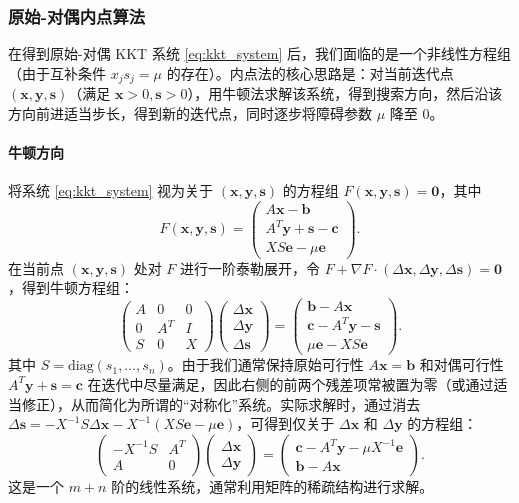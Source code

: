 \documentclass[12pt]{article}
\theoremstyle{plain}
\theoremstyle{definition}
\newcommand{\diag}{\mathrm{diag}}
\begin{document}
\subsubsection{原始-对偶内点算法}\label{subsubsec:primal_dual_algo}

在得到原始-对偶 KKT 系统 \eqref{eq:kkt_system} 后，我们面临的是一个非线性方程组（由于互补条件 $x_j s_j = \mu$ 的存在）。内点法的核心思路是：对当前迭代点 $(\bm{x}, \bm{y}, \bm{s})$（满足 $\bm{x}>0,\bm{s}>0$），用牛顿法求解该系统，得到搜索方向，然后沿该方向前进适当步长，得到新的迭代点，同时逐步将障碍参数 $\mu$ 降至 $0$。

\paragraph{牛顿方向}
将系统 \eqref{eq:kkt_system} 视为关于 $(\bm{x}, \bm{y}, \bm{s})$ 的方程组 $F(\bm{x},\bm{y},\bm{s}) = \bm{0}$，其中
\[
F(\bm{x},\bm{y},\bm{s}) = \begin{pmatrix}
A\bm{x} - \bm{b} \\
A^T\bm{y} + \bm{s} - \bm{c} \\
X S \bm{e} - \mu \bm{e}
\end{pmatrix}.
\]
在当前点 $(\bm{x},\bm{y},\bm{s})$ 处对 $F$ 进行一阶泰勒展开，令 $F + \nabla F \cdot (\Delta \bm{x}, \Delta \bm{y}, \Delta \bm{s}) = \bm{0}$，得到牛顿方程组：
\[
\begin{pmatrix}
A & 0 & 0 \\
0 & A^T & I \\
S & 0 & X
\end{pmatrix}
\begin{pmatrix}
\Delta \bm{x} \\ \Delta \bm{y} \\ \Delta \bm{s}
\end{pmatrix}
=
\begin{pmatrix}
\bm{b} - A\bm{x} \\
\bm{c} - A^T\bm{y} - \bm{s} \\
\mu \bm{e} - X S \bm{e}
\end{pmatrix}.
\]
其中 $S = \diag(s_1,\dots,s_n)$。由于我们通常保持原始可行性 $A\bm{x}=\bm{b}$ 和对偶可行性 $A^T\bm{y}+\bm{s}=\bm{c}$ 在迭代中尽量满足，因此右侧的前两个残差项常被置为零（或通过适当修正），从而简化为所谓的“对称化”系统。实际求解时，通过消去 $\Delta \bm{s} = -X^{-1}S \Delta \bm{x} - X^{-1}(X S \bm{e} - \mu \bm{e})$，可得到仅关于 $\Delta \bm{x}$ 和 $\Delta \bm{y}$ 的方程组：
\[
\begin{pmatrix}
-X^{-1}S & A^T \\
A & 0
\end{pmatrix}
\begin{pmatrix}
\Delta \bm{x} \\ \Delta \bm{y}
\end{pmatrix}
=
\begin{pmatrix}
\bm{c} - A^T\bm{y} - \mu X^{-1}\bm{e} \\
\bm{b} - A\bm{x}
\end{pmatrix}.
\]
这是一个 $m+n$ 阶的线性系统，通常利用矩阵的稀疏结构进行求解。
\end{document}
